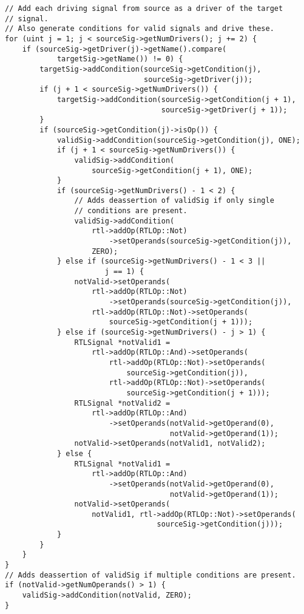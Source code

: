 \lstset{language=C++,style=Cstyle}
\begin{lstlisting}[caption={Source Code: Generating valid signals},label=sec:validsinglssourcecode]
// Add each driving signal from source as a driver of the target
// signal.
// Also generate conditions for valid signals and drive these.
for (uint j = 1; j < sourceSig->getNumDrivers(); j += 2) {
    if (sourceSig->getDriver(j)->getName().compare(
            targetSig->getName()) != 0) {
        targetSig->addCondition(sourceSig->getCondition(j),
                                sourceSig->getDriver(j));
        if (j + 1 < sourceSig->getNumDrivers()) {
            targetSig->addCondition(sourceSig->getCondition(j + 1),
                                    sourceSig->getDriver(j + 1));
        }
        if (sourceSig->getCondition(j)->isOp()) {
            validSig->addCondition(sourceSig->getCondition(j), ONE);
            if (j + 1 < sourceSig->getNumDrivers()) {
                validSig->addCondition(
                    sourceSig->getCondition(j + 1), ONE);
            }
            if (sourceSig->getNumDrivers() - 1 < 2) {
                // Adds deassertion of validSig if only single
                // conditions are present.
                validSig->addCondition(
                    rtl->addOp(RTLOp::Not)
                        ->setOperands(sourceSig->getCondition(j)),
                    ZERO);
            } else if (sourceSig->getNumDrivers() - 1 < 3 ||
                       j == 1) {
                notValid->setOperands(
                    rtl->addOp(RTLOp::Not)
                        ->setOperands(sourceSig->getCondition(j)),
                    rtl->addOp(RTLOp::Not)->setOperands(
                        sourceSig->getCondition(j + 1)));
            } else if (sourceSig->getNumDrivers() - j > 1) {
                RTLSignal *notValid1 =
                    rtl->addOp(RTLOp::And)->setOperands(
                        rtl->addOp(RTLOp::Not)->setOperands(
                            sourceSig->getCondition(j)),
                        rtl->addOp(RTLOp::Not)->setOperands(
                            sourceSig->getCondition(j + 1)));
                RTLSignal *notValid2 =
                    rtl->addOp(RTLOp::And)
                        ->setOperands(notValid->getOperand(0),
                                      notValid->getOperand(1));
                notValid->setOperands(notValid1, notValid2);
            } else {
                RTLSignal *notValid1 =
                    rtl->addOp(RTLOp::And)
                        ->setOperands(notValid->getOperand(0),
                                      notValid->getOperand(1));
                notValid->setOperands(
                    notValid1, rtl->addOp(RTLOp::Not)->setOperands(
                                   sourceSig->getCondition(j)));
            }
        }
    }
}
// Adds deassertion of validSig if multiple conditions are present.
if (notValid->getNumOperands() > 1) {
    validSig->addCondition(notValid, ZERO);
}
\end{lstlisting}

